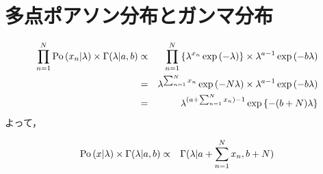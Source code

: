 \documentclass[a4j]{jarticle}
\begin{document}
\section{多点ポアソン分布とガンマ分布}
\begin{eqnarray}
\prod_{n=1}^{N}{\operatorname{\rm Po}{(x_n | \lambda)}} \times \Gamma(\lambda | a, b)
&\propto& \prod_{n=1}^{N}{\left\{ \lambda^{x_n} \exp{(-\lambda)} \right\}} \times \lambda^{a-1} \exp{(-b \lambda)}\\
&=& \lambda^{\sum_{n=1}^{N}{x_n}} \exp{(-N \lambda)} \times \lambda^{a-1} \exp{(-b \lambda)}\\
&=& \lambda^{(a+\sum_{n=1}^{N}{x_n})-1} \exp{\left\{ -(b + N) \lambda \right\}}
\end{eqnarray}
よって，
\begin{screen}
\begin{eqnarray}
\operatorname{\rm Po}{(x | \lambda)} \times \Gamma(\lambda | a, b)
&\propto&
\Gamma(\lambda | a + \sum_{n=1}^{N}{x_n}, b + N)
\end{eqnarray}
\end{screen}
\end{document}
